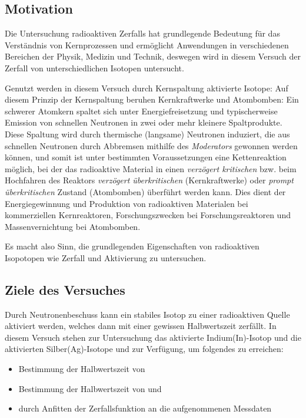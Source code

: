 \subsection{Motivation}
Die Untersuchung radioaktiven Zerfalls hat grundlegende Bedeutung für das Verständnis von Kernprozessen und ermöglicht Anwendungen in verschiedenen Bereichen der Physik, Medizin und Technik, deswegen wird in diesem Versuch der Zerfall von unterschiedlichen Isotopen untersucht.

Genutzt werden in diesem Versuch durch Kernspaltung aktivierte Isotope: Auf diesem Prinzip der Kernspaltung beruhen Kernkraftwerke und Atombomben: Ein schwerer Atomkern spaltet sich unter Energiefreisetzung und typischerweise Emission von schnellen Neutronen in zwei oder mehr kleinere Spaltprodukte. Diese Spaltung wird durch thermische (langsame) Neutronen induziert, die aus schnellen Neutronen durch Abbremsen mithilfe des \emph{Moderators} gewonnen werden können, und somit ist unter bestimmten Voraussetzungen eine Kettenreaktion möglich, bei der das radioaktive Material in einen \emph{verzögert kritischen} bzw. beim Hochfahren des Reaktors \emph{verzögert überkritischen} (Kernkraftwerke) oder \emph{prompt überkritischen} Zustand (Atombomben) überführt werden kann. Dies dient der Energiegewinnung und Produktion von radioaktiven Materialen bei kommerziellen Kernreaktoren, Forschungszwecken bei Forschungsreaktoren und Massenvernichtung bei Atombomben.

Es macht also Sinn, die grundlegenden Eigenschaften von radioaktiven Isopotopen wie Zerfall und Aktivierung zu untersuchen.

\subsection{Ziele des Versuches}
Durch Neutronenbeschuss kann ein stabiles Isotop zu einer radioaktiven Quelle aktiviert werden, welches dann mit einer gewissen Halbwertszeit zerfällt. In diesem Versuch stehen zur Untersuchung das aktivierte Indium(In)-Isotop  und die aktivierten Silber(Ag)-Isotope  und  zur Verfügung, um folgendes zu erreichen:
\begin{itemize}
    \item Bestimmung der Halbwertszeit von 
    \item Bestimmung der Halbwertszeit von  und 
    \item durch Anfitten der Zerfallsfunktion an die aufgenommenen Messdaten
\end{itemize}

